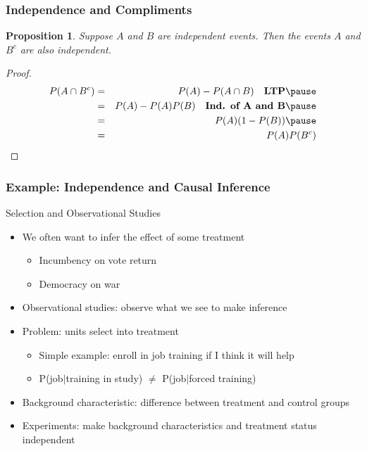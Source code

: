 \documentclass[handout]{beamer}
\newtheorem{prop}{Proposition}
\numberwithin{equation}{section}
\begin{document}
\begin{frame}
\frametitle{Independence and Compliments}

\begin{prop}
Suppose $A$ and $B$ are independent events. Then the events $A$ and $B^{c}$ are also independent.  
\end{prop}

\pause 

\begin{proof}
\begin{eqnarray}
P(A \cap B^{c} ) & = & P(A) - P(A \cap B)  \quad \textbf{LTP}\nonumber  \pause \\
& = & P(A)  - P(A) P(B)  \quad \textbf{Ind. of A and B} \nonumber  \pause \\
& = & P(A) ( 1- P(B) )  \pause \nonumber \\
& = & P(A) P(B^{c})   \nonumber 
\end{eqnarray}
\end{proof}



\end{frame}


\begin{frame}
\frametitle{Example: Independence and Causal Inference} 

Selection and Observational Studies
\begin{itemize}
\item[-] We often want to infer the effect of some treatment 
\begin{itemize}
\item[-] Incumbency on vote return 
\item[-] Democracy on war
\end{itemize}
\item[-] Observational studies: observe what we see to make inference 
\item[-] Problem: units select into treatment 
\begin{itemize}
\item[-] Simple example: enroll in job training if I think it will help 
\item[-] P(job$|$training in study) $\neq$ P(job$|$forced training) 
\end{itemize}
\item[-] \alert{Background characteristic}: difference between
  treatment and control groups
\item[-] \alert{Experiments}: make background characteristics and treatment status
  independent 
\end{itemize}


\end{frame}
\end{document}
